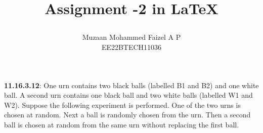 \documentclass[journal,12pt,twocolumn]{IEEEtran}
\providecommand{\pr}[1]{\ensuremath{\Pr\left(#1\right)}}
\providecommand{\cbrak}[1]{\ensuremath{\left\{#1\right\}}}
\begin{document}
\newtheorem{theorem}{Theorem}[section]
\newtheorem{problem}{Problem}
\newtheorem{proposition}{Proposition}[section]
\newtheorem{lemma}{Lemma}[section]
\newtheorem{corollary}[theorem]{Corollary}
\newtheorem{example}{Example}[section]
\newtheorem{definition}[problem]{Definition}
\newcommand{\BEQA}{\begin{eqnarray}}
\newcommand{\EEQA}{\end{eqnarray}}
\newcommand{\define}{\stackrel{\triangle}{=}}
\newcommand{\xor}{\oplus}


\providecommand{\mbf}{\mathbf}
\providecommand{\pr}[1]{\ensuremath{\Pr\left(#1\right)}}
\providecommand{\qfunc}[1]{\ensuremath{Q\left(#1\right)}}
\providecommand{\sbrak}[1]{\ensuremath{{}\left[#1\right]}}
\providecommand{\lsbrak}[1]{\ensuremath{{}\left[#1\right.}}
\providecommand{\rsbrak}[1]{\ensuremath{{}\left.#1\right]}}
\providecommand{\brak}[1]{\ensuremath{\left(#1\right)}}
\providecommand{\lbrak}[1]{\ensuremath{\left(#1\right.}}
\providecommand{\rbrak}[1]{\ensuremath{\left.#1\right)}}
\providecommand{\cbrak}[1]{\ensuremath{\left\{#1\right\}}}
\providecommand{\lcbrak}[1]{\ensuremath{\left\{#1\right.}}
\providecommand{\rcbrak}[1]{\ensuremath{\left.#1\right\}}}
\theoremstyle{remark}
\newtheorem{rem}{Remark}
\newcommand{\sgn}{\mathop{\mathrm{sgn}}}

\newcommand{\solution}{\noindent \textbf{Solution: }}
\newcommand{\cosec}{\,\text{cosec}\,}
\providecommand{\dec}[2]{\ensuremath{\overset{#1}{\underset{#2}{\gtrless}}}}
\newcommand{\myvec}[1]{\ensuremath{\begin{pmatrix}#1\end{pmatrix}}}
\newcommand{\mydet}[1]{\ensuremath{\begin{vmatrix}#1\end{vmatrix}}}

\let\vec\mathbf


\vspace{3cm}

\title{
  

  Assignment -2 in \LaTeX
    
  }
  \author{ Muzaan Mohammed Faizel A P\\
  EE22BTECH11036
  }	
\maketitle
\newpage
\bigskip
\renewcommand{\thefigure}{\theenumi}
\renewcommand{\thetable}{\theenumi}
\renewcommand{\thetable}{\arabic{table}}  
\textbf{11.16.3.12}:
One urn contains two black balls (labelled B1 and B2) and one white ball. A
second urn contains one black ball and two white balls (labelled W1 and W2).
Suppose the following experiment is performed. One of the two urns is chosen
at random. Next a ball is randomly chosen from the urn. Then a second ball is
chosen at random from the same urn without replacing the first ball.
\end{document}
